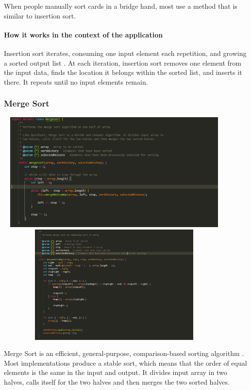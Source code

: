 When people manually sort cards in a bridge hand, most use a method that is similar to insertion sort.

\paragraph{How it works in the context of the application}
Insertion sort iterates, consuming one input element each repetition, and growing a sorted output list \cite{insertion_sort_geeks}. At each iteration, insertion sort removes one element from the input data, finds the location it belongs within the sorted list, and inserts it there. It repeats until no input elements remain.

\subsubsection{Merge Sort}
\begin{center}
    \includegraphics[width=12cm,height=6cm,keepaspectratio]{images/mergesort1}
    \includegraphics[width=12cm,height=6cm,keepaspectratio]{images/mergesort2}
\end{center}
Merge Sort is an efficient, general-purpose, comparison-based sorting algorithm \cite{merge_sort}. Most implementations produce a stable sort, which means that the order of equal elements is the same in the input and output. It divides input array in two halves, calls itself for the two halves and then merges the two sorted halves.

